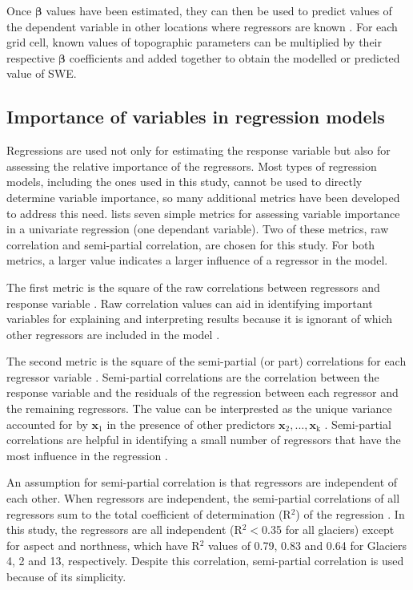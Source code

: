 \documentclass[12pt]{article}
\renewcommand{\vector}[1]{\mathbf{#1}}
\begin{document}
Once $\bm{\beta}$ values have been estimated, they can then be used to predict values of the dependent variable in other locations where regressors are known \citep{Davis1986}. For each grid cell, known values of topographic parameters can be multiplied by their respective $\bm{\beta}$ coefficients and added together to obtain the modelled or predicted value of SWE.

\subsection{Importance of variables in regression models}

Regressions are used not only for estimating the response variable but also for assessing the relative importance of the regressors. Most types of regression models, including the ones used in this study, cannot be used to directly determine variable importance, so many additional metrics have been developed to address this need. \cite{Gromping2015} lists seven simple metrics for assessing variable importance in a univariate regression (one dependant variable). Two of these metrics, raw correlation and semi-partial correlation, are chosen for this study. For both metrics, a larger value indicates a larger influence of a regressor in the model.

The first metric is the square of the raw correlations between regressors and response variable \citep{Gromping2015}. Raw correlation values can aid in identifying important variables for explaining and interpreting results because it is ignorant of which other regressors are included in the model \citep{Darlington1968}. 

The second metric is the square of the semi-partial (or part) correlations for each regressor variable \citep{Gromping2015}. Semi-partial correlations are the correlation between the response variable and the residuals of the regression between each regressor and the remaining regressors. The value can be interprested as the unique variance accounted for by $\vector{x}_1$ in the presence of other predictors $\vector{x}_2,...,\vector{x}_\mathrm{k}$ \citep{Darlington1968, Bring1996}. Semi-partial correlations are helpful in identifying a small number of regressors that have the most influence in the regression \citep{Gromping2009}.

An assumption for semi-partial correlation is that regressors are independent of each other. When regressors are independent, the semi-partial correlations of all regressors sum to the total coefficient of determination (R$^2$) of the regression  \citep{Gromping2015}. In this study, the regressors are all independent (R$^2<$0.35 for all glaciers) except for aspect and northness, which have R$^2$ values of 0.79, 0.83 and 0.64 for Glaciers 4, 2 and 13, respectively. Despite this correlation, semi-partial correlation is used because of its simplicity. 
\end{document}
